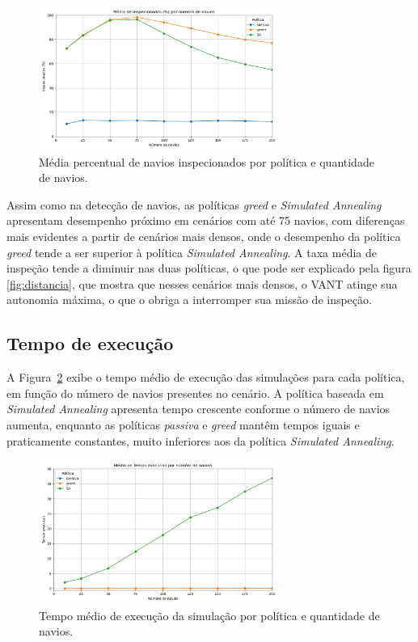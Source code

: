 \begin{figure}[H]
    \centering
    \includegraphics[width=0.7\textwidth]{fig/resultado_ins.png}
    \caption{Média percentual de navios inspecionados por política e quantidade de navios.}
    \label{fig:inspecionados}
\end{figure}

Assim como na detecção de navios, as políticas \textit{greed} e \textit{Simulated Annealing} apresentam desempenho próximo em cenários com até 75 navios, com diferenças mais evidentes a partir de cenários mais densos, onde o desempenho da política \textit{greed} tende a ser superior à política \textit{Simulated Annealing}. A taxa média de inspeção tende a diminuir nas duas políticas, o que pode ser explicado pela figura \ref{fig:distancia}, que mostra que nesses cenários mais densos, o VANT atinge sua autonomia máxima, o que o obriga a interromper sua missão de inspeção.

\subsection{Tempo de execução}

A Figura~\ref{fig:tempo_execucao} exibe o tempo médio de execução das simulações para cada política, em função do número de navios presentes no cenário. A política baseada em \textit{Simulated Annealing} apresenta tempo crescente conforme o número de navios aumenta, enquanto as políticas \textit{passiva} e \textit{greed} mantêm tempos iguais e praticamente constantes, muito inferiores aos da política \textit{Simulated Annealing}.

\begin{figure}[H]
    \centering
    \includegraphics[width=0.7\textwidth]{fig/resultado_tem.png}
    \caption{Tempo médio de execução da simulação por política e quantidade de navios.}
    \label{fig:tempo_execucao}
\end{figure}

